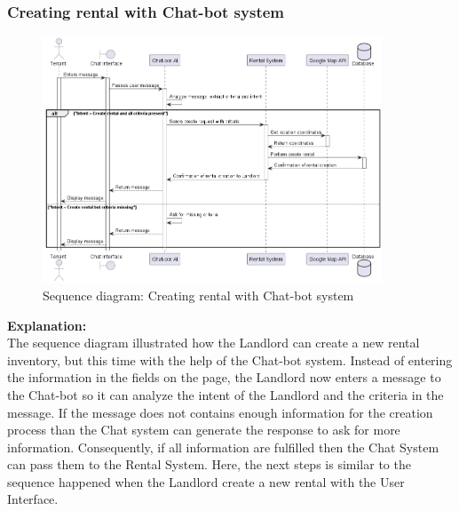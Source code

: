 \subsubsection{Creating rental with Chat-bot system}
\begin{figure}[H]
    \centering
    \includegraphics[width=0.9\textwidth]{Images/Sequence/seq_diag_create_rental_inventory_bot.png}
    \caption{Sequence diagram: Creating rental with Chat-bot system}
    \label{fig:seq-diag-create-chat-bot}
\end{figure}
\noindent \textbf{Explanation:}\\
The sequence diagram illustrated how the Landlord can create a new rental inventory, but this time with the help of the Chat-bot system. Instead of entering the information in the fields on the page, the Landlord now enters a message to the Chat-bot so it can analyze the intent of the Landlord and the criteria in the message. If the message does not contains enough information for the creation process than the Chat system can generate the response to ask for more information.
Consequently, if all information are fulfilled then the Chat System can pass them to the Rental System. Here, the next steps is similar to the sequence happened when the Landlord create a new rental with the User Interface.



\newpage
